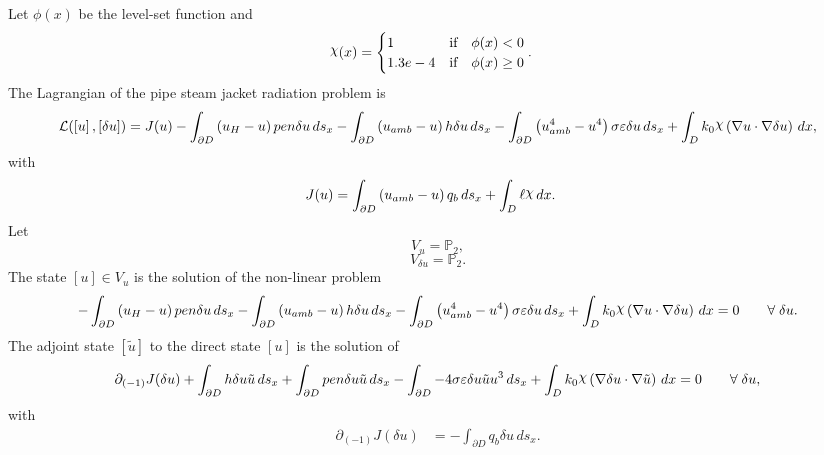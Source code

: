 \documentclass[preview]{standalone}
\let\oldcdot\cdot
\let\cdot\oldcdot
\begin{document}
Let $\phi(x)$ be the level-set function and
 \begin{align*}\raisebox{\depth}{$\chi$}(x) &= \begin{cases} 1 & \mbox{if}\quad \phi(x) < 0 \\ 1.3e-4 & \mbox{if}\quad \phi(x)  \ge 0 \end{cases}.\end{align*}
The Lagrangian of the pipe steam jacket radiation problem is
\begin{dmath*}
\mathcal L(\left[ u\right],\left[ \delta u\right]) = J(u) -  \int_{\partial D} \left(u_{H} - u\right) pen \delta u \,ds_x -  \int_{\partial D} \left(u_{amb} - u\right) h \delta u \,ds_x -  \int_{\partial D} \left(u_{amb}^{4} - u^{4}\right) \sigma \varepsilon \delta u \,ds_x +  \int_{D} k_{0} \raisebox{\depth}{$\chi$} \left(  \nabla u  \cdot  \nabla \delta u  \right) \,dx , 
\end{dmath*}
with 
\begin{align*}
J(u) &=  \int_{\partial D} \left(u_{amb} - u\right) q_{b} \,ds_x +  \int_{D} \ell \raisebox{\depth}{$\chi$} \,dx.
 \end{align*}
Let
\begin{equation*}
V_{u} = \mathbb P_{2},\end{equation*}
\begin{equation*}
V_{\delta u} = \mathbb P_{2}.\end{equation*}
The state $\left[ u\right] \in  V_{u}$ is the solution of the non-linear problem
\begin{dmath*}
-  \int_{\partial D} \left(u_{H} - u\right) pen \delta u \,ds_x -  \int_{\partial D} \left(u_{amb} - u\right) h \delta u \,ds_x -  \int_{\partial D} \left(u_{amb}^{4} - u^{4}\right) \sigma \varepsilon \delta u \,ds_x +  \int_{D} k_{0} \raisebox{\depth}{$\chi$} \left(  \nabla u  \cdot  \nabla \delta u  \right) \,dx = 0\qquad \forall\; \delta u . 
\end{dmath*}
The adjoint state $\left[ \tilde u\right]$ to the direct state $\left[ u\right]$ is the solution of
\begin{dmath*}
\partial_{(-1)} J(\delta u) +  \int_{\partial D} h \delta u \tilde u \,ds_x +  \int_{\partial D} pen \delta u \tilde u \,ds_x -  \int_{\partial D} - 4 \sigma \varepsilon \delta u \tilde u u^{3} \,ds_x +  \int_{D} k_{0} \raisebox{\depth}{$\chi$} \left(  \nabla \delta u  \cdot  \nabla \tilde u  \right) \,dx = 0\qquad \forall\; \delta u , 
\end{dmath*}
with 
\begin{align*}
\partial_{(-1)} J(\delta u) &= -  \int_{\partial D} q_{b} \delta u \,ds_x.
 \end{align*}
\end{document}
